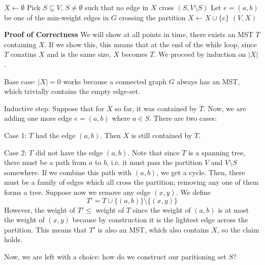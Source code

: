 \begin{algothm}
    \begin{algorithmic}
            \State $X \gets \emptyset$
                \State Pick $S \subsetneq V$, $S \neq \emptyset$ such that no edge in $X$ cross $(S, V\setminus S)$
                \State Let $e = (a, b)$ be one of the min-weight edges in $G$ crossing the partition
                \State $X \gets X \cup \{e\}$
            \EndWhile
            \State \Return $(V, X)$
        \EndFunction
    \end{algorithmic}

    \textbf{Proof of Correctness}
    We will show at all points in time, there exists an MST $T$ containing $X$. If we show this, this means that at the end of the while loop, since $T$ conatins $X$ and is the same size,
    $X$ becomes $T$. We proceed by induction on $|X|$.

    Base case: $|X| = 0$ works because a connected graph $G$ always has an MST, which trivially contains the empty edge-set.

    Inductive step: Suppose that for $X$ so far, it was contained by $T$. Now, we are adding one more edge $e = (a, b)$ where $a \in S$. There are two cases:

    Case 1: $T$ had the edge $(a, b)$. Then $X$ is still contained by $T$.

    Case 2: $T$ did not have the edge $(a, b)$. Note that since $T$ is a spanning tree, there must be a path from $a$ to $b$, i.e. it must
    pass the partition $V$ and $V \setminus S$ somewhere. If we combine this path with $(a, b)$, we get a cycle. Then, there must be a family of
    edges which all cross the partition; removing any one of them forms a tree. Suppose now we remove any edge $(x, y)$. We define
    \[ T' = T \cup \{(a, b) \} \setminus \{ (x, y) \} \]
    However, the weight of $T' \leq$ weight of $T$ since the weight of $(a, b)$ is at most the weight of $(x, y)$ because by construction it is the lightest edge
    across the partition. This means that $T'$ is also an MST, which also contains $X$, so the claim holds.
\end{algothm}

Now, we are left with a choice: how do we construct our paritioning set $S$?


